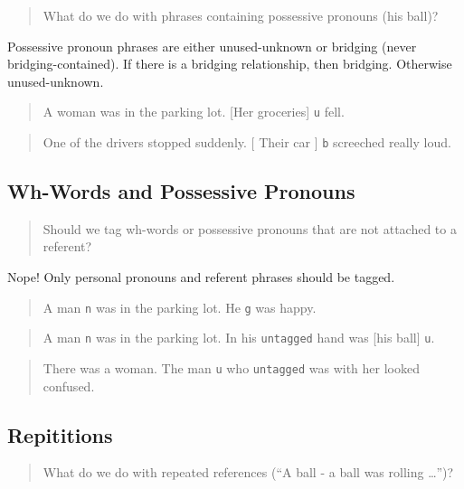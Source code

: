 \documentclass[
]{book}
\begin{document}
\begin{quote}
What do we do with phrases containing possessive pronouns (his ball)?
\end{quote}

Possessive pronoun phrases are either unused-unknown or bridging (never bridging-contained).
If there is a bridging relationship, then bridging. Otherwise unused-unknown.

\begin{quote}
A woman was in the parking lot.
{[}Her groceries{]} \texttt{u} fell.
\end{quote}

\begin{quote}
One of the drivers stopped suddenly.
{[} Their car {]} \texttt{b} screeched really loud.
\end{quote}

\hypertarget{wh-words-and-possessive-pronouns}{%
\subsection{Wh-Words and Possessive Pronouns}\label{wh-words-and-possessive-pronouns}}

\begin{quote}
Should we tag wh-words or possessive pronouns that are not attached to a referent?
\end{quote}

Nope! Only personal pronouns and referent phrases should be tagged.

\begin{quote}
A man \texttt{n} was in the parking lot.
He \texttt{g} was happy.
\end{quote}

\begin{quote}
A man \texttt{n} was in the parking lot.
In his \texttt{untagged} hand was {[}his ball{]} \texttt{u}.
\end{quote}

\begin{quote}
There was a woman.
The man \texttt{u} who \texttt{untagged} was with her looked confused.
\end{quote}

\hypertarget{repititions}{%
\subsection{Repititions}\label{repititions}}

\begin{quote}
What do we do with repeated references (``A ball - a ball was rolling \ldots{}'')?
\end{quote}
\end{document}
